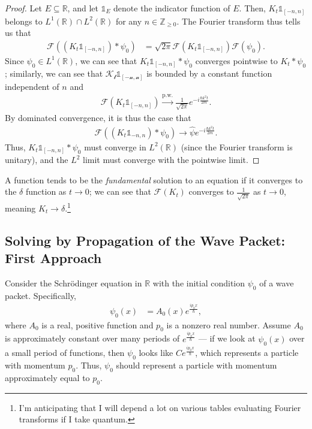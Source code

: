 \documentclass[12pt]{extarticle}
\newcommand{\Z}{\mathbb{Z}}
\newcommand{\R}{\mathbb{R}}
\theoremstyle{plain}
\theoremstyle{definition}
\theoremstyle{remark}
\renewcommand{\newline}{\hfill\break}
\begin{document}
  \begin{proof}
    Let $E\subseteq \R$, and let $\mathbb{1}_E$ denote the indicator function of $E$. Then, $K_t \mathbb{1}_{[-n,n]}$ belongs to $L^{1}(\R) \cap L^{2}(\R)$ for any $n \in \Z_{\geq 0}$. The Fourier transform thus tells us that
    \begin{align*}
      \mathcal{F}\left(\left(K_t \mathbb{1}_{[-n,n]}\right)\ast \psi_0\right) &= \sqrt{2\pi}\mathcal{F}\left(K_t \mathbb{1}_{[-n,n]}\right) \mathcal{F}\left(\psi_0\right).
    \end{align*}
    Since $\psi_0 \in L^{1}(\R)$, we can see that $K_t \mathbb{1}_{[-n,n]}\ast \psi_0$ converges pointwise to $K_t\ast \psi_0$; similarly, we can see that $\mathcal{K_t \mathbb{1}_{[-n,n]}}$ is bounded by a constant function independent of $n$ and
    \begin{align*}
      \mathcal{F}\left(K_t \mathbb{1}_{[-n,n]}\right) \xrightarrow{\text{p.w.}} \frac{1}{\sqrt{2\pi}}e^{-i\frac{\hbar k^2t}{2m}}.
    \end{align*}
    By dominated convergence, it is thus the case that
    \begin{align*}
      \mathcal{F}\left(\left(K_t \mathbb{1}_{-n,n}\right)\ast \psi_0\right) \rightarrow \hat{\psi}e^{-i\frac{\hbar k^2t}{2m}}.
    \end{align*}
    Thus, $K_t\mathbb{1}_{[-n,n]}\ast \psi_0$ must converge in $L^2(\R)$ (since the Fourier transform is unitary), and the $L^2$ limit must converge with the pointwise limit.
  \end{proof}
  A function tends to be the \textit{fundamental} solution to an equation if it converges to the $\delta$ function as $t\rightarrow 0$; we can see that $\mathcal{F}\left(K_t\right)$ converges to $\frac{1}{\sqrt{2\pi}}$ as $t\rightarrow 0$, meaning $K_t \rightarrow \delta$.\footnote{I'm anticipating that I will depend a lot on various tables evaluating Fourier transforms if I take quantum.}
  \subsection{Solving by Propagation of the Wave Packet: First Approach}%
  Consider the Schrödinger equation in $\R$ with the initial condition $\psi_0$ of a wave packet. Specifically,
  \begin{align*}
    \psi_0(x) &= A_0(x)e^{\frac{ip_0x}{\hbar}},
  \end{align*}
  where $A_0$ is a real, positive function and $p_0$ is a nonzero real number. Assume $A_0$ is approximately constant over many periods of $e^{\frac{ip_0x}{\hbar}}$ --- if we look at $\psi_0(x)$ over a small period of functions, then $\psi_0$ looks like $Ce^{\frac{ip_0x}{\hbar}}$, which represents a particle with momentum $p_0$. Thus, $\psi_0$ should represent a particle with momentum approximately equal to $p_0$.\newline
\end{document}
